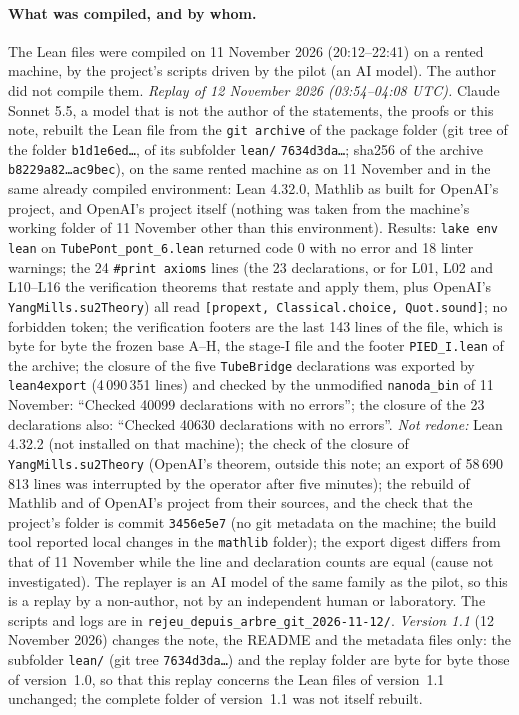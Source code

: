 \documentclass[11pt,a4paper]{article}
\theoremstyle{plain}
\theoremstyle{definition}
\theoremstyle{remark}
\numberwithin{equation}{section}
\begin{document}
\paragraph{What was compiled, and by whom.} The Lean files were compiled on 11 November 2026 (20:12--22:41) on a rented machine, by the project's scripts driven by the pilot (an AI model). The author did not compile them. \emph{Replay of 12 November 2026 (03:54--04:08 UTC).} Claude Sonnet 5.5, a model that is not the author of the statements, the proofs or this note, rebuilt the Lean file from the \texttt{git archive} of the package folder (git tree of the folder \texttt{b1d1e6ed\dots}, of its subfolder \texttt{lean/} \texttt{7634d3da\dots}; sha256 of the archive \texttt{b8229a82\dots ac9bec}), on the same rented machine as on 11 November and in the same already compiled environment: Lean 4.32.0, Mathlib as built for OpenAI's project, and OpenAI's project itself (nothing was taken from the machine's working folder of 11 November other than this environment). Results: \texttt{lake env lean} on \texttt{TubePont\_pont\_6.lean} returned code 0 with no error and 18 linter warnings; the 24 \texttt{\#print axioms} lines (the 23 declarations, or for L01, L02 and L10--L16 the verification theorems that restate and apply them, plus OpenAI's \texttt{YangMills.su2Theory}) all read \texttt{[propext, Classical.choice, Quot.sound]}; no forbidden token; the verification footers are the last 143 lines of the file, which is byte for byte the frozen base A--H, the stage-I file and the footer \texttt{PIED\_I.lean} of the archive; the closure of the five \texttt{TubeBridge} declarations was exported by \texttt{lean4export} (4\,090\,351 lines) and checked by the unmodified \texttt{nanoda\_bin} of 11 November: ``Checked 40099 declarations with no errors''; the closure of the 23 declarations also: ``Checked 40630 declarations with no errors''. \emph{Not redone:} Lean 4.32.2 (not installed on that machine); the check of the closure of \texttt{YangMills.su2Theory} (OpenAI's theorem, outside this note; an export of 58\,690\,813 lines was interrupted by the operator after five minutes); the rebuild of Mathlib and of OpenAI's project from their sources, and the check that the project's folder is commit \texttt{3456e5e7} (no git metadata on the machine; the build tool reported local changes in the \texttt{mathlib} folder); the export digest differs from that of 11 November while the line and declaration counts are equal (cause not investigated). The replayer is an AI model of the same family as the pilot, so this is a replay by a non-author, not by an independent human or laboratory. The scripts and logs are in \texttt{rejeu\_depuis\_arbre\_git\_2026-11-12/}. \emph{Version 1.1} (12 November 2026) changes the note, the README and the metadata files only: the subfolder \texttt{lean/} (git tree \texttt{7634d3da\dots}) and the replay folder are byte for byte those of version~1.0, so that this replay concerns the Lean files of version~1.1 unchanged; the complete folder of version~1.1 was not itself rebuilt.
\end{document}
